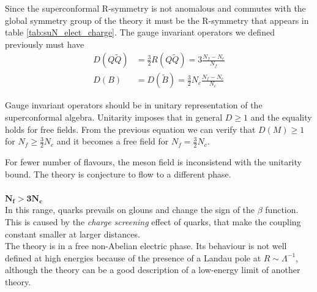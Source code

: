 Since the superconformal R-symmetry is not anomalous and commutes with the global symmetry group of the theory it must be the R-symmetry that appears in table \ref{tab:suN_elect_charge}.
The gauge invariant operators we defined previously must have
\begin{align}
 D(Q \tilde{Q}) &= \frac{3}{2} R(Q \tilde{Q}) = 3 \frac{N_f - N_c}{N_f}\\
 D(B) & = D(\tilde{B})  = \frac{3}{2} N_c \frac{N_f - N_c}{N_c}
\end{align}

Gauge invariant operators should be in unitary representation of the superconformal algebra.
Unitarity imposes that in general $D\geq 1$ and the equality holds for free fields.
From the previous equation we can verify that $D(M) \geq 1$ for $ N_f \geq \frac{3}{2}N_c$ and it becomes a free field for $N_f = \frac{3}{2}N_c$. 

For fewer number of flavours, the meson field is inconsistend with the unitarity bound.
The theory is conjecture to flow to a different phase.
\\
\\
$\mathbf{ N_f > 3 N_c}$\\
In this range, quarks prevails on glouns and change the sign of the $\beta$ function. 
This is caused by the \emph{charge screening} effect of quarks, that make the coupling constant smaller at larger distances.\\
The theory is in a free non-Abelian electric phase.
Its behaviour is not well defined at high energies because of the presence of a Landau pole at $R \sim \Lambda^{-1}$, although the theory can be a good description of a low-energy limit of another theory. 

